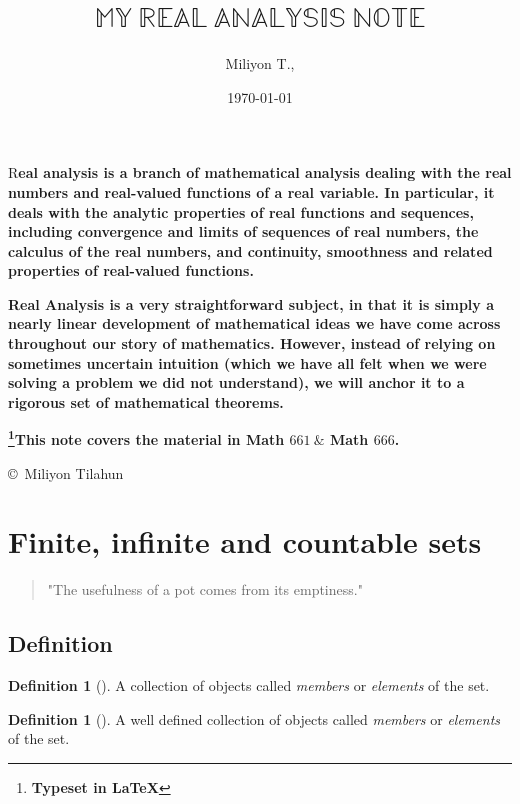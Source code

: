 \documentclass[	DIV=calc,paper=a4,fontsize=11pt]{scrartcl}	 	%
\title{$\mathbb{MY\ REAL\ ANALYSIS \ NOTE}$}					%
\author{Miliyon T.,}											%
\date{\today}											%
\theoremstyle{definition}
\newtheorem{defn}[thm]{Definition}
\theoremstyle{plain}
\theoremstyle{remark}
\newcommand{\initial}[1]{%
     \lettrine[lines=3,lhang=0.3,nindent=0em]{
     				\color{DarkGoldenrod}
     				{\textsf{#1}}}{}}
\begin{document}
\clearpage
\maketitle
\thispagestyle{empty}
\initial{R}\textbf{eal analysis is a branch of mathematical analysis dealing with the real numbers and real-valued functions of a real variable. In particular, it deals with the analytic properties of real functions and sequences, including convergence and limits of sequences of real numbers, the calculus of the real numbers, and continuity, smoothness and related properties of real-valued functions.}

\medskip

\noindent \textbf{Real Analysis is a very straightforward subject, in that it is simply a nearly linear development of mathematical ideas we have come across throughout our story of mathematics. However, instead of relying on sometimes uncertain intuition (which we have all felt when we were solving a problem we did not understand), we will anchor it to a rigorous set of mathematical theorems.}

\medskip
\noindent\textbf{\footnote[*]{\textbf{Typeset in \LaTeX}}This note covers the material in Math $661\ \&$ Math $666$.}
\vfil

\begin{center}
\copyright ~Miliyon Tilahun
\end{center}
\newpage
\tableofcontents
\newpage
\thispagestyle{fancy} 			%


\section{Finite, infinite and countable sets}

\begin{quote}
"The usefulness of a pot comes from its emptiness."
\end{quote}

\subsection{Definition}

\begin{defn}[\textbf{\color{blue}{Set}}]
A collection of objects called \textit{members} or \textit{elements} of the set.
\end{defn}

\begin{defn}[\textbf{\color{blue}{Relation}}]
A well defined collection of objects called \textit{members} or \textit{elements} of the set.
\end{defn}
\end{document}
